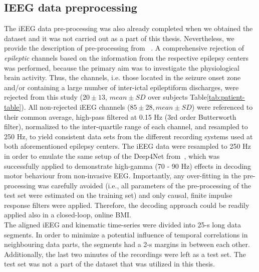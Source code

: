 \subsection{IEEG data preprocessing}\label{subsec:ieeg-data-preprocessing}
The iEEG data pre-processing was also already completed when we obtained the dataset and it was not carried out as a part of this thesis. Nevertheless, we provide the description of pre-processing from ~\cite{Hammer-2021}.
A comprehensive rejection of \textit{epileptic} channels based on the information from the respective epilepsy centers was performed, because the primary aim was to investigate the physiological brain activity.
Thus, the channels, i.e. those located in the seizure onset zone and/or containing a large number of inter-ictal epileptiform discharges, were rejected from this study ($20 \pm 13$, $mean \pm SD$ over subjects Table\ref{tab:patient-table}).
All non-rejected iEEG channels ($85 \pm 28, mean \pm SD$) were referenced to their common average, high-pass filtered at 0.15 Hz (3rd order Butterworth filter), normalized to the inter-quartile range of each channel, and resampled to 250 Hz, to yield consistent data sets from the different recording systems used at both aforementioned epilepsy centers.
The iEEG data were resampled to 250 Hz in order to emulate the same setup of the Deep4Net from~\cite{schirrmeister-deep-2017}, which was successfully applied to demonstrate high-gamma (70 - 90 Hz) effects in decoding motor behaviour from non-invasive EEG. Importantly, any over-fitting in the pre-processing was carefully avoided (i.e., all parameters of the pre-processing of the test set were estimated on the training set) and only causal, finite impulse response filters were applied.
Therefore, the decoding approach could be readily applied also in a closed-loop, online BMI. \\

The aligned iEEG and kinematic time-series were divided into 25-s long data segments.
In order to minimize a potential influence of temporal correlations in neighbouring data parts, the segments had a 2-s margins in between each other. Additionally, the last two minutes of the recordings were left as a test set. The test set was not a part of the dataset that was utilized in this thesis.


